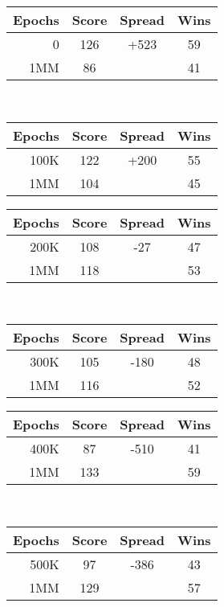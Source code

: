 

\begin{table}
\center

\begin{tabular}{|r|c|c|c|}
	\hline
	\textbf{Epochs} & \textbf{Score} & \textbf{Spread} & \textbf{Wins}
	\\\hline
	0 & 126 & +523 & 59
	\\\hline
	1MM & 86 & \textemdash & 41
	\\\hline
\end{tabular}
~
\begin{tabular}{|r|c|c|c|}
	\hline
	\textbf{Epochs} & \textbf{Score} & \textbf{Spread} & \textbf{Wins}
	\\\hline
	100K & 122 & +200 & 55
	\\\hline
	1MM & 104 & \textemdash & 45
	\\\hline
\end{tabular}

\begin{tabular}{|r|c|c|c|}
	\hline
	\textbf{Epochs} & \textbf{Score} & \textbf{Spread} & \textbf{Wins}
	\\\hline
	200K & 108 & -27 & 47
	\\\hline
	1MM & 118 & \textemdash & 53
	\\\hline
\end{tabular}
~
\begin{tabular}{|r|c|c|c|}
	\hline
	\textbf{Epochs} & \textbf{Score} & \textbf{Spread} & \textbf{Wins}
	\\\hline
	300K & 105 & -180 & 48
	\\\hline
	1MM & 116 & \textemdash & 52
	\\\hline
\end{tabular}

\begin{tabular}{|r|c|c|c|}
	\hline
	\textbf{Epochs} & \textbf{Score} & \textbf{Spread} & \textbf{Wins}
	\\\hline
	400K & 87 & -510 & 41
	\\\hline
	1MM & 133 & \textemdash & 59
	\\\hline
\end{tabular}
~
\begin{tabular}{|r|c|c|c|}
	\hline
	\textbf{Epochs} & \textbf{Score} & \textbf{Spread} & \textbf{Wins}
	\\\hline
	500K & 97 & -386 & 43
	\\\hline
	1MM & 129 & \textemdash & 57
	\\\hline
\end{tabular}


\end{table}
